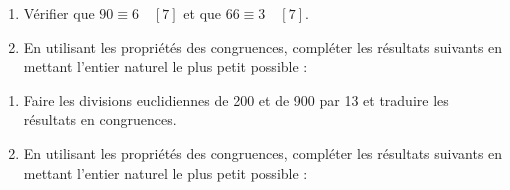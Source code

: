 \begin{exercice}[]
	\begin{enumerate}
		\item 	Vérifier que $90\equiv 6\quad[7]$ et que $66\equiv 3\quad[7]$.
		\item 	En utilisant les propriétés des congruences, compléter les résultats suivants en
		      mettant l'entier naturel le plus petit possible :
		      \begin{multicols}{2}
		      \end{multicols}
	\end{enumerate}
\end{exercice}


\begin{exercice}[]
	
	\begin{enumerate}
		\item 	Faire les divisions euclidiennes de 200 et de 900 par 13 et traduire les résultats en congruences.
		\item 	En utilisant les propriétés des congruences, compléter les résultats suivants en mettant l'entier naturel le plus petit possible :
		      
		      \begin{multicols}{2}
			      \begin{enumalph}
				      \item 	$200 + 900\equiv\dotfill\quad[13]$
				      \item 	$200 \times 900\equiv\dotfill\quad[13]$
				      \item 	$2002\equiv\dotfill\quad[13]$
				      \item 	$9003\equiv\dotfill\quad[13]$
				      \item 	$2900\equiv\dotfill\quad[13]$
				      \item 	$9413\equiv\dotfill\quad[13]$
			      \end{enumalph}
		      \end{multicols}
	\end{enumerate}
\end{exercice}


